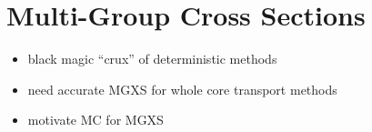 \section{Multi-Group Cross Sections}
\label{sec:chap1-mgxs}

\begin{itemize}[noitemsep]
  \item black magic ``crux'' of deterministic methods
  \item need accurate \ac{MGXS} for whole core transport methods
  \item motivate \ac{MC} for \ac{MGXS}
\end{itemize}